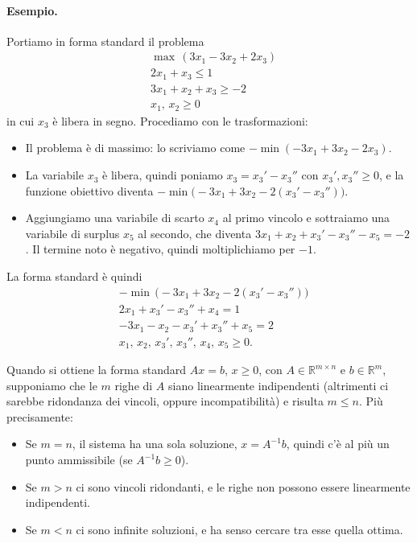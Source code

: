 \paragraph{Esempio.}
Portiamo in forma standard il problema
\[
\begin{aligned}
&\max\, (3x_1 - 3x_2 + 2x_3) \\
&2x_1 + x_3 \le 1 \\
&3x_1 + x_2 + x_3 \ge -2 \\
&x_1,\, x_2 \ge 0
\end{aligned}
\]
in cui $x_3$ è libera in segno. Procediamo con le trasformazioni:
\begin{itemize}
    \item Il problema è di massimo: lo scriviamo come $-\min(-3x_1 + 3x_2 - 2x_3)$.
    \item La variabile $x_3$ è libera, quindi poniamo $x_3 = x_3' - x_3''$ con $x_3', x_3'' \ge 0$, e la funzione obiettivo diventa $-\min\big(-3x_1 + 3x_2 - 2(x_3' - x_3'')\big)$.
    \item Aggiungiamo una variabile di scarto $x_4$ al primo vincolo e sottraiamo una variabile di surplus $x_5$ al secondo, che diventa $3x_1 + x_2 + x_3' - x_3'' - x_5 = -2$. Il termine noto è negativo, quindi moltiplichiamo per $-1$.
\end{itemize}
La forma standard è quindi
\[
\begin{aligned}
&-\min\, \big(-3x_1 + 3x_2 - 2(x_3' - x_3'')\big) \\
&2x_1 + x_3' - x_3'' + x_4 = 1 \\
&-3x_1 - x_2 - x_3' + x_3'' + x_5 = 2 \\
&x_1,\, x_2,\, x_3',\, x_3'',\, x_4,\, x_5 \ge 0.
\end{aligned}
\]

\begin{osservazione}
Quando si ottiene la forma standard $A x = b$, $x \ge 0$, con $A \in \mathbb{R}^{m \times n}$ e $b \in \mathbb{R}^m$, supponiamo che le $m$ righe di $A$ siano linearmente indipendenti (altrimenti ci sarebbe ridondanza dei vincoli, oppure incompatibilità) e risulta $m \le n$. Più precisamente:
\begin{itemize}
    \item Se $m = n$, il sistema ha una sola soluzione, $x = A^{-1}b$, quindi c'è al più un punto ammissibile (se $A^{-1}b \ge 0$).
    \item Se $m > n$ ci sono vincoli ridondanti, e le righe non possono essere linearmente indipendenti.
    \item Se $m < n$ ci sono infinite soluzioni, e ha senso cercare tra esse quella ottima.
\end{itemize}
\end{osservazione}

